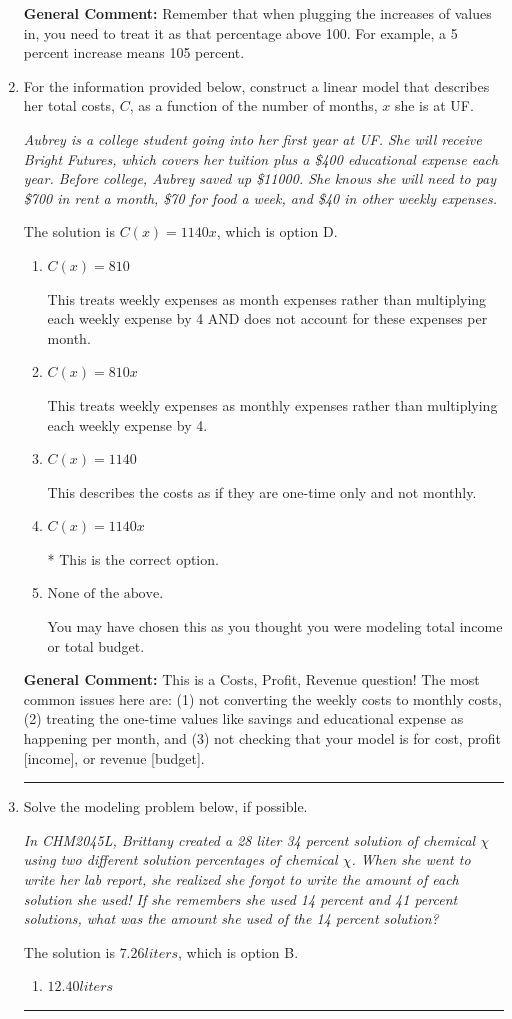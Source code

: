 \documentclass{extbook}[14pt]
\newcommand{\litem}[1]{\item #1

\rule{\textwidth}{0.4pt}}
\begin{document}
\begin{enumerate}
{\textbf{General Comment:} Remember that when plugging the increases of values in, you need to treat it as that percentage above 100. For example, a 5 percent increase means 105 percent.
}
\litem{
For the information provided below, construct a linear model that describes her total costs, $C$, as a function of the number of months, $x$ she is at UF. 

\begin{center}
    \textit{ Aubrey is a college student going into her first year at UF. She will receive Bright Futures, which covers her tuition plus a \$400 educational expense each year. Before college, Aubrey saved up \$11000. She knows she will need to pay \$700 in rent a month, \$70 for food a week, and \$40 in other weekly expenses. }
\end{center}
The solution is \( C(x) = 1140 x \), which is option D.\begin{enumerate}[label=\Alph*.]
\item \( C(x) = 810 \)

This treats weekly expenses as month expenses rather than multiplying each weekly expense by 4 AND does not account for these expenses per month.
\item \( C(x) = 810 x \)

This treats weekly expenses as monthly expenses rather than multiplying each weekly expense by 4.
\item \( C(x) = 1140 \)

This describes the costs as if they are one-time only and not monthly.
\item \( C(x) = 1140 x \)

* This is the correct option.
\item \( \text{None of the above.} \)

You may have chosen this as you thought you were modeling total income or total budget.
\end{enumerate}

\textbf{General Comment:} This is a Costs, Profit, Revenue question! The most common issues here are: (1) not converting the weekly costs to monthly costs, (2) treating the one-time values like savings and educational expense as happening per month, and (3) not checking that your model is for cost, profit [income], or revenue [budget].
}
\litem{
Solve the modeling problem below, if possible.

\begin{center}
    \textit{ In CHM2045L, Brittany created a 28 liter 34 percent solution of chemical $\chi$ using two different solution percentages of chemical $\chi$. When she went to write her lab report, she realized she forgot to write the amount of each solution she used! If she remembers she used 14 percent and 41 percent solutions, what was the amount she used of the 14 percent solution? }
\end{center}
The solution is \( 7.26 liters \), which is option B.\begin{enumerate}[label=\Alph*.]
\item \( 12.40 liters \)


\end{enumerate}}
\end{enumerate}
\end{document}
